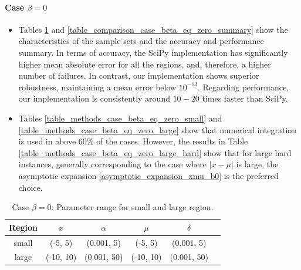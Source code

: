 \documentclass[10pt,a4paper,oneside]{article}
\numberwithin{equation}{section}
\begin{document}
\paragraph{Case $\beta = 0$}
\begin{itemize}
\item Tables \ref{table_parameters_case_beta_eq_zero} and \ref{table_comparison_case_beta_eq_zero_summary} show the characteristics of the sample sets and the accuracy and performance summary. In terms of accuracy, the SciPy implementation has significantly higher mean absolute error for all the regions, and, therefore, a higher number of failures. In contrast, our implementation shows superior robustness, maintaining a mean error below $10^{-13}$. Regarding performance, our implementation is consistently around $10-20$ times faster than SciPy.
\item Tables \ref{table_methods_case_beta_eq_zero_small} and \ref{table_methods_case_beta_eq_zero_large} show that numerical integration is used in above 60\% of the cases. However, the results in Table \ref{table_methods_case_beta_eq_zero_large_hard} show that for large hard instances, generally corresponding to the case where $|x-\mu|$ is large, the asymptotic expansion \eqref{asymptotic_expansion_xmu_b0} is the preferred choice.
\end{itemize}

\begin{table}[htbp]
\centering
\scalebox{0.9}
{
	\begin{tabular}{c|ccccc}
	\hline
	Region & $x$ & $\alpha$ & $\mu$ & $\delta$\\
	\hline	
	small & (-5, 5) & (0.001, 5) & (-5, 5) & (0.001, 5)\\
	large & (-10, 10) & (0.001, 50) & (-10, 10) & (0.001, 50)\\
	\hline	
	\end{tabular}
}
\caption{Case $\beta = 0$: Parameter range for small and large region.}
	\label{table_parameters_case_beta_eq_zero}
\end{table}
\end{document}
